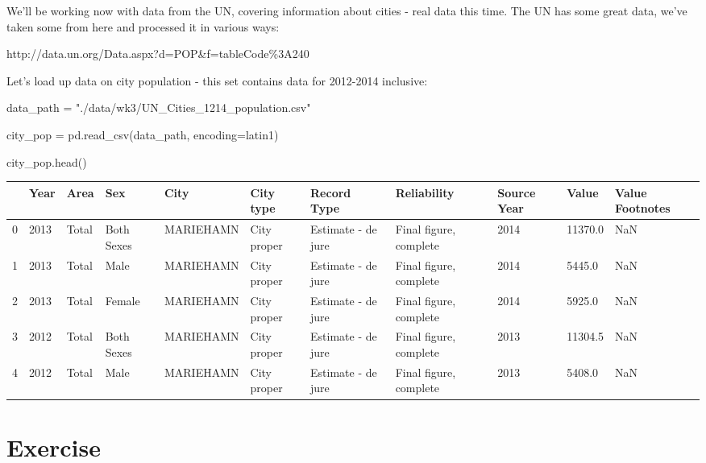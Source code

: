 \documentclass[
  letterpaper,
  DIV=11,
  numbers=noendperiod]{scrreprt}
\newenvironment{Shaded}{\begin{snugshade}}{\end{snugshade}}
\newcommand{\NormalTok}[1]{\textcolor[rgb]{0.00,0.23,0.31}{#1}}
\newcommand{\OperatorTok}[1]{\textcolor[rgb]{0.37,0.37,0.37}{#1}}
\newcommand{\StringTok}[1]{\textcolor[rgb]{0.13,0.47,0.30}{#1}}
\begin{document}
We'll be working now with data from the UN, covering information about
cities - real data this time. The UN has some great data, we've taken
some from here and processed it in various ways:

http://data.un.org/Data.aspx?d=POP\&f=tableCode\%3A240

Let's load up data on city population - this set contains data for
2012-2014 inclusive:

\begin{Shaded}
\begin{Highlighting}[]
\NormalTok{data\_path }\OperatorTok{=} \StringTok{"./data/wk3/UN\_Cities\_1214\_population.csv"}

\NormalTok{city\_pop }\OperatorTok{=}\NormalTok{ pd.read\_csv(data\_path, encoding}\OperatorTok{=}\StringTok{\textquotesingle{}latin1\textquotesingle{}}\NormalTok{)}
\end{Highlighting}
\end{Shaded}

\begin{Shaded}
\begin{Highlighting}[]
\NormalTok{city\_pop.head()}
\end{Highlighting}
\end{Shaded}

\begin{longtable}[]{@{}lllllllllll@{}}
\toprule()
& Year & Area & Sex & City & City type & Record Type & Reliability &
Source Year & Value & Value Footnotes \\
\midrule()
\endhead
0 & 2013 & Total & Both Sexes & MARIEHAMN & City proper & Estimate - de
jure & Final figure, complete & 2014 & 11370.0 & NaN \\
1 & 2013 & Total & Male & MARIEHAMN & City proper & Estimate - de jure &
Final figure, complete & 2014 & 5445.0 & NaN \\
2 & 2013 & Total & Female & MARIEHAMN & City proper & Estimate - de jure
& Final figure, complete & 2014 & 5925.0 & NaN \\
3 & 2012 & Total & Both Sexes & MARIEHAMN & City proper & Estimate - de
jure & Final figure, complete & 2013 & 11304.5 & NaN \\
4 & 2012 & Total & Male & MARIEHAMN & City proper & Estimate - de jure &
Final figure, complete & 2013 & 5408.0 & NaN \\
\bottomrule()
\end{longtable}

\hypertarget{exercise-14}{%
\section{Exercise}\label{exercise-14}}
\end{document}
